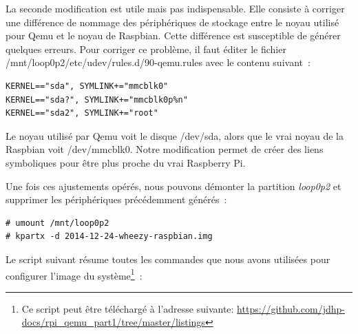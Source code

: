 \documentclass{article}
\begin{document}
La seconde modification est utile mais pas indispensable.
Elle consiste à corriger une différence de nommage des périphériques de stockage entre
le noyau utilisé pour Qemu et le noyau de Raspbian.
Cette différence est susceptible de générer quelques erreurs.
Pour corriger ce problème, il faut éditer le fichier \og{}/mnt/loop0p2/etc/udev/rules.d/90-qemu.rules\fg{}
avec le contenu suivant~:
\begin{verbatim}
KERNEL=="sda", SYMLINK+="mmcblk0"
KERNEL=="sda?", SYMLINK+="mmcblk0p%n"
KERNEL=="sda2", SYMLINK+="root"
\end{verbatim}

Le noyau utilisé par Qemu voit le disque \og{}/dev/sda\fg{}, alors que le
\og{}vrai\fg{} noyau de la Raspbian voit \og{}/dev/mmcblk0\fg{}.
Notre modification permet de créer des liens symboliques pour être plus
proche du vrai Raspberry Pi.

Une fois ces ajustements opérés, nous pouvons démonter la partition {\em
loop0p2} et supprimer les périphériques précédemment générés~:
\begin{verbatim}
# umount /mnt/loop0p2
# kpartx -d 2014-12-24-wheezy-raspbian.img
\end{verbatim}

Le script suivant résume toutes les commandes que nous avons utilisées pour
configurer l'image du système\footnote{Ce script peut être téléchargé à l'adresse suivante:
\url{https://github.com/jdhp-docs/rpi_qemu_part1/tree/master/listings}}~:

\begin{small}
    
\end{small}


\end{document}
